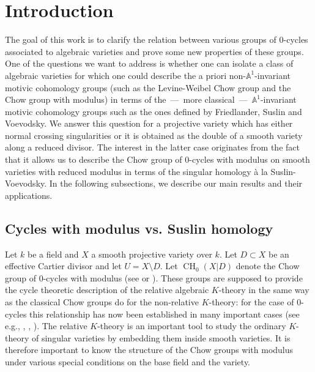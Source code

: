\documentclass[JEP,XML,SOM,Unicode,published]{cedram}
\theoremstyle{definition}
\newcommand{\A}{{\mathbb A}}
\DeclareMathOperator{\CH}{CH}
\begin{document}
\maketitle
\tableofcontents
\mainmatter

\section{Introduction}\label{sec:Introduction}
The goal of this work is to clarify the relation between various groups of $0$-cycles
associated to algebraic varieties and prove some new properties of these
groups. One of the questions we want to
address is whether one can isolate a class of algebraic varieties
for which one could describe the a priori non-$\A^1$-invariant motivic
cohomology groups (such as the Levine-Weibel Chow group and the Chow group
with modulus) in terms of the~---~more classical~---~$\A^1$-invariant motivic
cohomology groups
such as the ones
defined by Friedlander, Suslin and Voevodsky. We answer this question
for a projective variety which has either normal crossing singularities or
it is obtained as the double of a smooth variety along a reduced divisor.
The interest in the latter case originates from the fact that it
allows us to describe the Chow group of $0$-cycles with
modulus on smooth varieties with reduced modulus in terms of
the singular homology à la Suslin-Voevodsky.
In the following subsections, we describe our main results and their
applications.\enlargethispage{\baselineskip}%

\subsection{Cycles with modulus vs. Suslin homology}\label{sec:CM}
Let $k$ be a field and $X$ a smooth projective variety over $k$.
Let $D \subset X$ be an effective Cartier divisor and let $U = X \setminus D$.
Let $\CH_0(X|D)$ denote
the Chow group of $0$-cycles with modulus (see \cite{KS} or \cite{BS}).
These groups are supposed to provide the cycle theoretic
description of the relative algebraic $K$-theory in the same way as
the classical Chow groups do for the non-relative $K$-theory: for the case of $0$-cycles this relationship has now been established in many important cases (see e.g., \cite{BKS}, \cite{GKris2}, \cite{GKris}).
The relative $K$-theory is an important tool to study the ordinary
$K$-theory of singular varieties by embedding them inside smooth varieties.
It is therefore important to know the structure of the Chow groups with modulus
under various special conditions on the base field and the variety.
\end{document}
